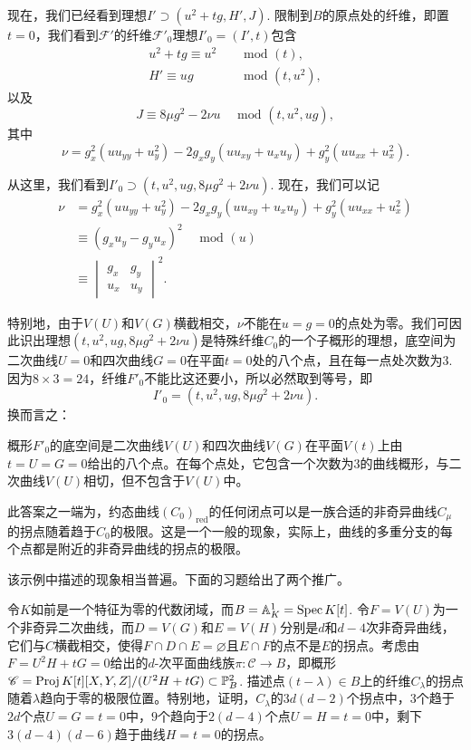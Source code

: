 现在，我们已经看到理想$I'\supset (u^2+tg,H',J)$. 限制到$B$的原点处的纤维，即置$t=0$，我们看到$\mathscr F'$的纤维$\mathscr F'_0$理想$I'_0=(I',t)$包含
\[
	\begin{aligned}
		u^2+tg \equiv u^2 &\quad \text{ mod } (t),\\
		H' \equiv ug &\quad \text{ mod } (t,u^2),
	\end{aligned}
\]
以及
\[
	J\equiv 8\mu g^2-2\nu u\quad \text{ mod } (t,u^2,ug),
\]
其中
\[
	\nu=g_x^2(uu_{yy}+u_y^2)-2g_xg_y(uu_{xy}+u_xu_y)+g_y^2(uu_{xx}+u_x^2).
\]

从这里，我们看到$I'_0\supset (t,u^2,ug,8\mu g^2+2\nu u)$. 现在，我们可以记
\[
	\begin{aligned}
		\nu &=g_x^2(uu_{yy}+u_y^2)-2g_xg_y(uu_{xy}+u_xu_y)+g_y^2(uu_{xx}+u_x^2)\\
		&\equiv (g_xu_y-g_yu_x)^2\quad \text{ mod } (u)\\
		&\equiv \begin{vmatrix}
			g_x&g_y\\
			u_x&u_y
		\end{vmatrix}^2.
	\end{aligned}
\]

特别地，由于$V(U)$和$V(G)$横截相交，$\nu$不能在$u=g=0$的点处为零。我们可因此识出理想$(t,u^2,ug,8\mu g^2+2\nu u)$是特殊纤维$C_0$的一个子概形的理想，底空间为二次曲线$U=0$和四次曲线$G=0$在平面$t=0$处的八个点，且在每一点处次数为$3$. 因为$8\times 3=24$，纤维$F'_0$不能比这还要小，所以必然取到等号，即
\[
	I'_0=(t,u^2,ug,8\mu g^2+2\nu u).
\]
换而言之：

\begin{pro}\label{pro:4.10}
	概形$F'_0$的底空间是二次曲线$V(U)$和四次曲线$V(G)$在平面$V(t)$上由$t=U=G=0$给出的八个点。在每个点处，它包含一个次数为$3$的曲线概形，与二次曲线$V(U)$相切，但不包含于$V(U)$中。
\end{pro}

此答案之一端为，约态曲线$(C_0)_{\text{red}}$的任何闭点可以是一族合适的非奇异曲线$C_\mu$的拐点随着趋于$C_0$的极限。这是一个一般的现象，实际上，曲线的多重分支的每个点都是附近的非奇异曲线的拐点的极限。

该示例中描述的现象相当普遍。下面的习题给出了两个推广。

\begin{exe}\label{exe:4.11}
	令$K$如前是一个特征为零的代数闭域，而$B=\mathbb A_K^1=\operatorname{Spec} K[t]$. 令$F=V(U)$为一个非奇异二次曲线，而$D=V(G)$和$E=V(H)$分别是$d$和$d-4$次非奇异曲线，它们与$C$横截相交，使得$F\cap D\cap E=\varnothing$且$E\cap F$的点不是$E$的拐点。考虑由$F=U^2H+tG=0$给出的$d$-次平面曲线族$\pi:\mathscr C\to B$，即概形$\mathscr C=\operatorname{Proj} K[t][X,Y,Z]/(U^2H+tG)\subset \mathbb P_B^2$. 描述点$(t-\lambda)\in B$上的纤维$C_\lambda$的拐点随着$\lambda$趋向于零的极限位置。特别地，证明，$C_\lambda$的$3d(d-2)$个拐点中，$3$个趋于$2d$个点$U=G=t=0$中，$9$个趋向于$2(d-4)$个点$U=H=t=0$中，剩下$3(d-4)(d-6)$趋于曲线$H=t=0$的拐点。
\end{exe}

